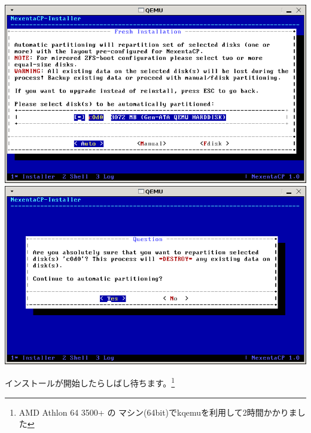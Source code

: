 \documentclass[mingoth,a4paper]{jsarticle}
\begin{document}
\includegraphics[width=0.5\hsize]{image200804/nexenta7.png}
\includegraphics[width=0.5\hsize]{image200804/nexenta8.png}

インストールが開始したらしばし待ちます。\footnote{AMD Athlon 64 3500+ の
マシン(64bit)でkqemuを利用して2時間かかりました}
\end{document}
